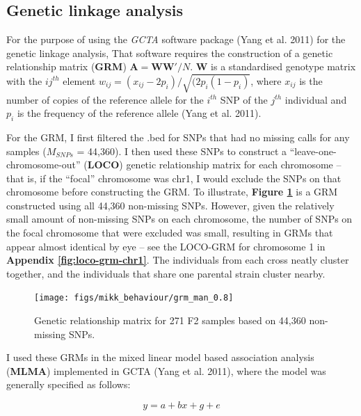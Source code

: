 \documentclass[
]{book}
\begin{document}
\hypertarget{genetic-linkage-analysis}{%
\subsection{Genetic linkage analysis}\label{genetic-linkage-analysis}}

For the purpose of using the \emph{GCTA} software package (Yang et al. 2011) for the genetic linkage analysis, That software requires the construction of a genetic relationship matrix (\textbf{GRM}) \(\textbf{A} = \textbf{WW}'/N\). \(\textbf{W}\) is a standardised genotype matrix with the \(ij^{th}\) element \(w_{ij} = (x_{ij} - 2p_i) / \sqrt{(2p_i(1-p_i)}\), where \(x_{ij}\) is the number of copies of the reference allele for the \(i^{th}\) SNP of the \(j^{th}\) individual and \(p_i\) is the frequency of the reference allele (Yang et al. 2011).

For the GRM, I first filtered the .bed for SNPs that had no missing calls for any samples (\(M_{SNPs}\) = 44,360). I then used these SNPs to construct a ``leave-one-chromosome-out'' (\textbf{LOCO}) genetic relationship matrix for each chromosome -- that is, if the ``focal'' chromosome was chr1, I would exclude the SNPs on that chromosome before constructing the GRM. To illustrate, \textbf{Figure \ref{fig:F2-grm}} is a GRM constructed using all 44,360 non-missing SNPs. However, given the relatively small amount of non-missing SNPs on each chromosome, the number of SNPs on the focal chromosome that were excluded was small, resulting in GRMs that appear almost identical by eye -- see the LOCO-GRM for chromosome 1 in \textbf{Appendix \ref{fig:loco-grm-chr1}}. The individuals from each cross neatly cluster together, and the individuals that share one parental strain cluster nearby.



\begin{figure}
\texttt{[image: figs/mikk\_behaviour/grm\_man\_0.8]} \caption{Genetic relationship matrix for 271 F2 samples based on 44,360 non-missing SNPs.}\label{fig:F2-grm}
\end{figure}

I used these GRMs in the mixed linear model based association analysis (\textbf{MLMA}) implemented in GCTA (Yang et al. 2011), where the model was generally specified as follows:

\[
y = a + bx + g + e
\]
\end{document}
